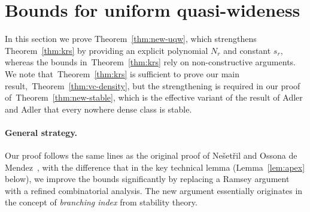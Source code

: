 \section{Bounds for uniform quasi-wideness}\label{sec:uqw}



In this section we prove Theorem~\ref{thm:new-uqw}, which strengthens
Theorem~\ref{thm:krs} by providing an explicit polynomial $N_r$ and
constant $s_r$, whereas the bounds in~Theorem~\ref{thm:krs} rely on
non-constructive arguments.  We note that~Theorem~\ref{thm:krs} is
sufficient to prove our main result,~Theorem~\ref{thm:vc-density}, but
the strengthening is required in our proof
of~Theorem~\ref{thm:new-stable}, which is the effective variant of the
result of Adler and Adler that every nowhere dense class is stable.

%


\vspace{-1mm}
\paragraph{General strategy.}
Our proof follows the same lines as the original proof of Ne\v set\v
ril and Ossona de Mendez~\cite{nevsetvril2011nowhere}, with the
difference that in the key technical lemma (Lemma~\ref{lem:apex}
below), we improve the bounds significantly by replacing a Ramsey
argument with a refined combinatorial analysis.  The new argument
essentially originates in the concept of {\em{branching index}} from
stability theory.

